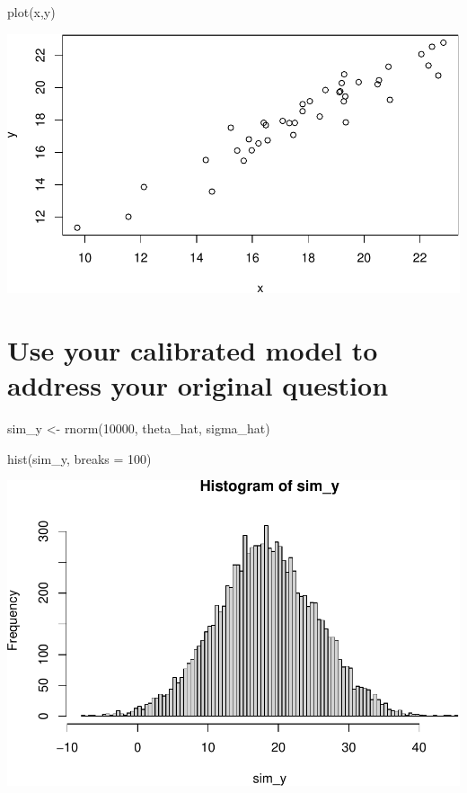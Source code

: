 \documentclass[
]{book}
\newenvironment{Shaded}{\begin{snugshade}}{\end{snugshade}}
\newcommand{\AttributeTok}[1]{\textcolor[rgb]{0.77,0.63,0.00}{#1}}
\newcommand{\DecValTok}[1]{\textcolor[rgb]{0.00,0.00,0.81}{#1}}
\newcommand{\FunctionTok}[1]{\textcolor[rgb]{0.00,0.00,0.00}{#1}}
\newcommand{\NormalTok}[1]{#1}
\newcommand{\OtherTok}[1]{\textcolor[rgb]{0.56,0.35,0.01}{#1}}
\begin{document}
\begin{Shaded}
\begin{Highlighting}[]
\FunctionTok{plot}\NormalTok{(x,y)}
\end{Highlighting}
\end{Shaded}

\includegraphics{graphics/unnamed-chunk-7-1.pdf}

\hypertarget{use-your-calibrated-model-to-address-your-original-question}{%
\section{Use your calibrated model to address your original question}\label{use-your-calibrated-model-to-address-your-original-question}}

\begin{Shaded}
\begin{Highlighting}[]
\NormalTok{sim\_y }\OtherTok{\textless{}{-}} \FunctionTok{rnorm}\NormalTok{(}\DecValTok{10000}\NormalTok{, theta\_hat, sigma\_hat)}

\FunctionTok{hist}\NormalTok{(sim\_y, }\AttributeTok{breaks =} \DecValTok{100}\NormalTok{)}
\end{Highlighting}
\end{Shaded}

\includegraphics{graphics/generate distribution of temp based on model results-1.pdf}
\end{document}

